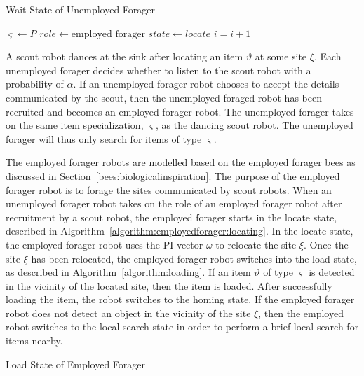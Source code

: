 \begin{algorithm}
\caption{Wait State of Unemployed Forager}
\label{algorithm:unemployedforager:locating}
\begin{algorithmic}[1]
	\State $\varsigma \gets P$
	\State {}
	\State $role \gets \text{employed forager}$
	\State $state \gets locate$
\EndIf
\State $i =i + 1$
\EndFunction
\end{algorithmic}
\end{algorithm}

A scout robot dances at the sink after locating an item $\vartheta$ at some site $\xi$. Each unemployed forager decides whether to listen to the scout robot with a probability of $\alpha$. If an unemployed forager robot chooses to accept the details communicated by the scout, then the unemployed foraged robot has been recruited and becomes an employed forager robot. The unemployed forager takes on the same item specialization, $\varsigma$, as the dancing scout robot. The unemployed forager will thus only search for items of type $\varsigma$. 

The employed forager robots are modelled based on the employed forager bees as discussed in Section~\ref{bees:biologicalinspiration}. The purpose of the employed forager robot is to forage the sites communicated by scout robots. When an unemployed forager robot takes on the role of an employed forager robot after recruitment by a scout robot, the employed forager starts in the locate state, described in Algorithm~\ref{algorithm:employedforager:locating}. In the locate state, the employed forager robot uses the PI vector $\omega$ to relocate the site $\xi$. Once the site $\xi$ has been relocated, the employed forager robot switches into the load state, as described in Algorithm~\ref{algorithm:loading}. If an item $\vartheta$ of type $\varsigma$ is detected in the vicinity of the located site, then the item is loaded. After successfully loading the item, the robot switches to the homing state. If the employed forager robot does not detect an object in the vicinity of the site $\xi$, then the employed robot switches to the local search state in order to perform a brief local search for items nearby. 

\begin{algorithm}
\caption{Load State of Employed Forager}
\label{algorithm:loading}
\begin{algorithmic}[1]
	\State {}
\Else
\EndIf
\EndFunction
\end{algorithmic}
\end{algorithm}

